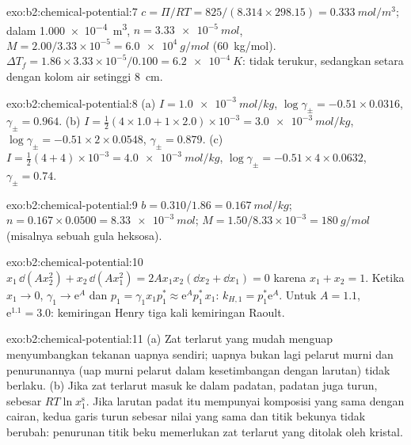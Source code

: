 \begin{solution}{exo:b2:chemical-potential:7}
$c = \Pi/RT = 825/(8.314 \times 298.15) = \qty{0.333}{mol/m^3}$; dalam
\qty{1.000e-4}{m^3}, $n = \qty{3.33e-5}{mol}$, $M = 2.00/3.33 \times 10^{-5}
= \qty{6.0e4}{g/mol}$ (\qty{60}{kg/mol}). $\Delta T_f = 1.86 \times 3.33
\times 10^{-5}/0.100 = \qty{6.2e-4}{K}$: tidak terukur, sedangkan  setara dengan kolom air setinggi \qty{8}{cm}.
\end{solution}

\begin{solution}{exo:b2:chemical-potential:8}
(a) $I = \qty{1.0e-3}{mol/kg}$, $\log\gamma_\pm = -0.51 \times 0.0316$,
$\gamma_\pm = 0.964$. (b) $I = \frac12(4 \times 1.0 + 1 \times 2.0) \times
10^{-3} = \qty{3.0e-3}{mol/kg}$, $\log\gamma_\pm = -0.51 \times 2 \times 0.0548$,
$\gamma_\pm = 0.879$. (c) $I = \frac12(4 + 4) \times 10^{-3} = \qty{4.0e-3}{mol/kg}$,
$\log\gamma_\pm = -0.51 \times 4 \times 0.0632$, $\gamma_\pm = 0.74$.
\end{solution}

\begin{solution}{exo:b2:chemical-potential:9}
$b = 0.310/1.86 = \qty{0.167}{mol/kg}$; $n = 0.167 \times 0.0500 =
\qty{8.33e-3}{mol}$; $M = 1.50/8.33 \times 10^{-3} = \qty{180}{g/mol}$
(misalnya sebuah gula heksosa).
\end{solution}

\begin{solution}{exo:b2:chemical-potential:10}
$x_1\,\dd(Ax_2^2) + x_2\,\dd(Ax_1^2) = 2Ax_1x_2(\dd x_2 + \dd x_1) = 0$
karena $x_1 + x_2 = 1$. Ketika $x_1 \to 0$, $\gamma_1 \to \mathrm e^{A}$ dan
$p_1 =
\gamma_1x_1p_1^* \approx \mathrm e^{A}p_1^*\,x_1$:
$k_{H,1} = p_1^*\mathrm e^A$. Untuk $A = 1.1$, $\mathrm e^{1.1} = 3.0$:
kemiringan Henry tiga kali kemiringan Raoult.
\end{solution}

\begin{solution}{exo:b2:chemical-potential:11}
(a) Zat terlarut yang mudah menguap menyumbangkan tekanan uapnya sendiri;
uapnya bukan lagi pelarut murni dan penurunannya (uap murni pelarut dalam
kesetimbangan dengan larutan) tidak berlaku. (b) Jika zat terlarut masuk
ke dalam padatan,  padatan juga turun, sebesar
$RT\ln x_1^{\text{s}}$. Jika larutan padat itu mempunyai komposisi yang
sama dengan cairan, kedua garis turun sebesar nilai yang sama dan titik
bekunya tidak berubah: penurunan titik beku memerlukan zat terlarut yang
ditolak oleh kristal.
\end{solution}

